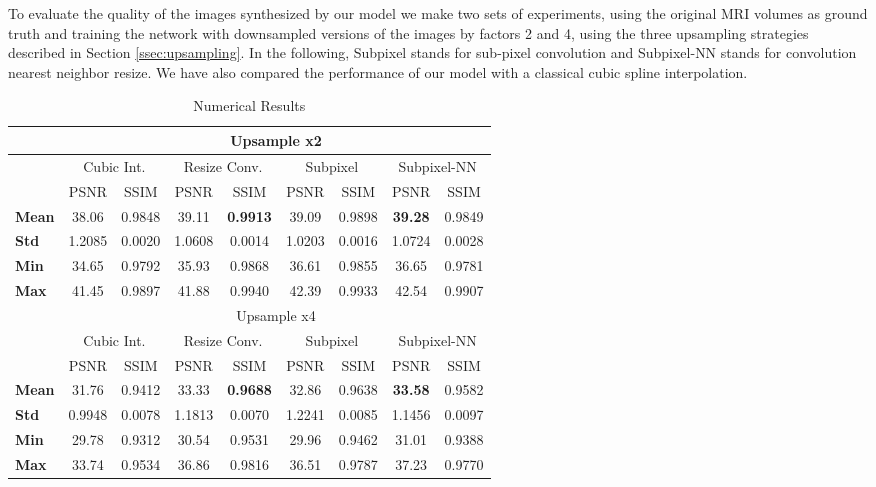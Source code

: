 \documentclass{article}
\begin{document}
To evaluate the quality of the images synthesized by our model we make two sets of experiments, using the original MRI volumes as ground truth and training the network with downsampled versions of the images by factors 2 and 4, using the three upsampling strategies described in Section \ref{ssec:upsampling}. In the following, Subpixel stands for sub-pixel convolution and Subpixel-NN stands for convolution nearest neighbor resize. We have also compared the performance of our model with a classical cubic spline interpolation.



\begin{table}[h]
\centering
\begin{tabular}{ l@{}c c c c c c c c }
\hline
&\multicolumn{8}{c}{Upsample x2}\\
\hline
&\multicolumn{2}{c}{Cubic Int.} &
 \multicolumn{2}{c}{Resize Conv.} &
 \multicolumn{2}{c}{Subpixel} &
 \multicolumn{2}{c}{Subpixel-NN} \\
\hline
& PSNR & SSIM & PSNR & SSIM & PSNR & SSIM & PSNR & SSIM  \\
\hline
\textbf{Mean } & 38.06 & 0.9848 & 39.11 & \textbf{0.9913} & 39.09 & 0.9898 & \textbf{39.28} & 0.9849\\
\textbf{Std} & 1.2085 & 0.0020 & 1.0608 & 0.0014 & 1.0203 & 0.0016 & 1.0724 & 0.0028\\
\textbf{Min} & 34.65 & 0.9792 & 35.93 & 0.9868 & 36.61 & 0.9855 & 36.65 & 0.9781\\
\textbf{Max} & 41.45 & 0.9897 & 41.88 & 0.9940 & 42.39 & 0.9933 & 42.54 & 0.9907\\
\hline
&\multicolumn{8}{c}{Upsample x4}\\
\hline
&\multicolumn{2}{c}{Cubic Int.} &
 \multicolumn{2}{c}{Resize Conv.} &
 \multicolumn{2}{c}{Subpixel} &
 \multicolumn{2}{c}{Subpixel-NN} \\
\hline
& PSNR & SSIM & PSNR & SSIM & PSNR & SSIM & PSNR & SSIM  \\
\hline
 \textbf{Mean } & 31.76 & 0.9412 & 33.33 & \textbf{0.9688} & 32.86 & 0.9638 & \textbf{33.58} & 0.9582\\
 \textbf{Std} & 0.9948 & 0.0078 & 1.1813 & 0.0070 & 1.2241 & 0.0085 & 1.1456 & 0.0097 \\
 \textbf{Min} & 29.78 & 0.9312 & 30.54 & 0.9531 & 29.96 & 0.9462 & 31.01 & 0.9388\\
 \textbf{Max} & 33.74 & 0.9534 & 36.86 & 0.9816 & 36.51 & 0.9787 & 37.23 & 0.9770\\

\hline
\end{tabular}
\caption{Numerical Results}
\label{tab:results_performance}
\end{table}
\end{document}
